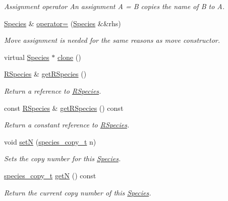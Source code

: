 \begin{DoxyCompactItemize}
\begin{DoxyCompactList}\small\item\em Assignment operator An assignment A = B copies the name of B to A. \end{DoxyCompactList}\item 
\hyperlink{classchem_1_1Species}{Species} \& \hyperlink{classchem_1_1Species_ae9344aa4bcd5fb1a511361bef72162f6}{operator=} (\hyperlink{classchem_1_1Species}{Species} \&\&rhs)
\begin{DoxyCompactList}\small\item\em Move assignment is needed for the same reasons as move constructor. \end{DoxyCompactList}\item 
virtual \hyperlink{classchem_1_1Species}{Species} $\ast$ \hyperlink{classchem_1_1Species_acf0054a3704627698ba91293e8d0d370}{clone} ()
\item 
\hyperlink{classchem_1_1RSpecies}{R\-Species} \& \hyperlink{classchem_1_1Species_a1719a8155a69e9a62593d23d4bfc8514}{get\-R\-Species} ()
\begin{DoxyCompactList}\small\item\em Return a reference to \hyperlink{classchem_1_1RSpecies}{R\-Species}. \end{DoxyCompactList}\item 
const \hyperlink{classchem_1_1RSpecies}{R\-Species} \& \hyperlink{classchem_1_1Species_a438dae186317809effdd040ed38c568b}{get\-R\-Species} () const 
\begin{DoxyCompactList}\small\item\em Return a constant reference to \hyperlink{classchem_1_1RSpecies}{R\-Species}. \end{DoxyCompactList}\item 
void \hyperlink{classchem_1_1Species_af10a33a212fdb986fb93613e9c219f7a}{set\-N} (\hyperlink{common_8h_a3503f321fd36304ee274141275cca586}{species\-\_\-copy\-\_\-t} n)
\begin{DoxyCompactList}\small\item\em Sets the copy number for this \hyperlink{classchem_1_1Species}{Species}. \end{DoxyCompactList}\item 
\hyperlink{common_8h_a3503f321fd36304ee274141275cca586}{species\-\_\-copy\-\_\-t} \hyperlink{classchem_1_1Species_af7c9f51060b84169b428a7796dad6dca}{get\-N} () const 
\begin{DoxyCompactList}\small\item\em Return the current copy number of this \hyperlink{classchem_1_1Species}{Species}. \end{DoxyCompactList}\item 

\end{DoxyCompactItemize}
